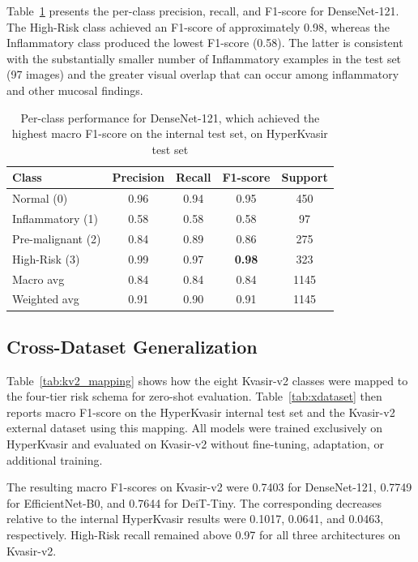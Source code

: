 \documentclass[11pt,a4paper]{article}
\begin{document}
Table~\ref{tab:per_class} presents the per-class precision, recall, and
F1-score for DenseNet-121. The High-Risk class achieved an F1-score of
approximately 0.98, whereas the Inflammatory class produced the lowest
F1-score (0.58). The latter is consistent with the substantially smaller
number of Inflammatory examples in the test set (97 images) and the greater
visual overlap that can occur among inflammatory and other mucosal findings.

\begin{table}[H]
\centering
\caption{Per-class performance for DenseNet-121, which achieved the highest macro F1-score on the internal test set, on HyperKvasir test set}
\label{tab:per_class}
\begin{tabular}{lcccc}
\toprule
\textbf{Class} & \textbf{Precision} & \textbf{Recall} & \textbf{F1-score}
& \textbf{Support}\\
\midrule
Normal (0)        & 0.96 & 0.94 & 0.95 & 450\\
Inflammatory (1)  & 0.58 & 0.58 & 0.58 &  97\\
Pre-malignant (2) & 0.84 & 0.89 & 0.86 & 275\\
High-Risk (3)     & 0.99 & 0.97 & \textbf{0.98} & 323\\
\midrule
Macro avg         & 0.84 & 0.84 & 0.84 & 1145\\
Weighted avg      & 0.91 & 0.90 & 0.91 & 1145\\
\bottomrule
\end{tabular}
\end{table}

\subsection{Cross-Dataset Generalization}

Table~\ref{tab:kv2_mapping} shows how the eight Kvasir-v2 classes were
mapped to the four-tier risk schema for zero-shot evaluation. Table~\ref{tab:xdataset}
then reports macro F1-score on the HyperKvasir internal
test set and the Kvasir-v2 external dataset using this mapping. All models were trained
exclusively on HyperKvasir and evaluated on Kvasir-v2 without fine-tuning,
adaptation, or additional training.

The resulting macro F1-scores on Kvasir-v2 were 0.7403 for DenseNet-121,
0.7749 for EfficientNet-B0, and 0.7644 for DeiT-Tiny. The corresponding
decreases relative to the internal HyperKvasir results were 0.1017, 0.0641,
and 0.0463, respectively. High-Risk recall remained above 0.97 for all three
architectures on Kvasir-v2.
\end{document}

